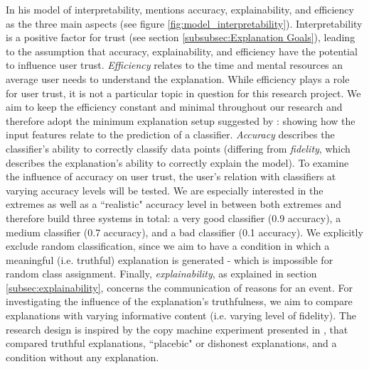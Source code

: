 \noindent In his model of interpretability, \cite{ruping2006learning} mentions accuracy, explainability, and efficiency as the three main aspects (see figure \ref{fig:model_interpretability}). Interpretability is a positive factor for trust (see section \ref{subsubsec:Explanation Goals}), leading to the assumption that accuracy, explainability, and efficiency have the potential to influence user trust. \textit{Efficiency} relates to the time and mental resources an average user needs to understand the explanation. While efficiency plays a role for user trust, it is not a particular topic in question for this research project. We aim to keep the efficiency constant and minimal throughout our research and therefore adopt the minimum explanation setup suggested by \cite{goodman16eu}: showing how the input features relate to the prediction of a classifier. \newline
\textit{Accuracy} describes the classifier's ability to correctly classify data points (differing from \textit{fidelity}, which describes the explanation's ability to correctly explain the model). To examine the influence of accuracy on user trust, the user's relation with classifiers at varying accuracy levels will be tested. We are especially interested in the extremes as well as a ``realistic" accuracy level in between both extremes and therefore build three systems in total: a very good classifier (0.9 accuracy), a medium classifier (0.7 accuracy), and a bad classifier (0.1 accuracy). We explicitly exclude random classification, since we aim to have a condition in which a meaningful (i.e. truthful) explanation is generated - which is impossible for random class assignment.\newline
Finally, \textit{explainability}, as explained in section \ref{subsec:explainability}, concerns the communication of reasons for an event. For investigating the influence of the explanation's truthfulness, we aim to compare explanations with varying informative content (i.e. varying level of fidelity). The research design is inspired by the copy machine experiment presented in \cite{langer1978mindlessness}, that compared truthful explanations, ``placebic" or dishonest explanations, and a condition without any explanation.



